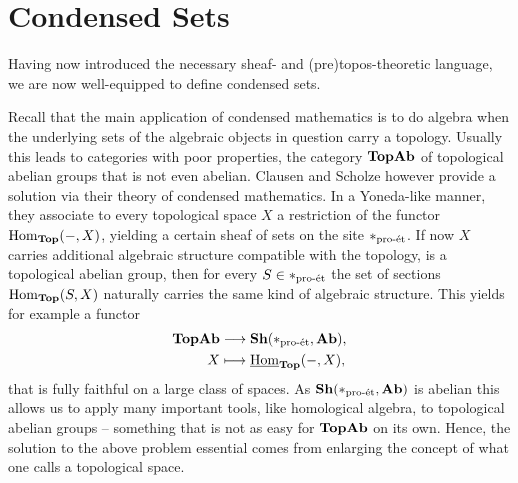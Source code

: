 
\section{Condensed Sets}
\label{section: condensed sets}

Having now introduced the necessary sheaf- and (pre)topos-theoretic language, we are now well-equipped to define condensed sets.

Recall that the main application of condensed mathematics is to do algebra when the underlying sets of the algebraic objects in question carry a topology. Usually this leads to categories with poor properties, \eg the category $\TopAb$ of topological abelian groups that is not even abelian. Clausen and Scholze however provide a solution via their theory of condensed mathematics. In a Yoneda-like manner, they associate to every topological space $X$ a restriction of the functor $\Hom_\Top(-, X)$, yielding a certain sheaf of sets on the site $\proetalesite{\ast}$. If now $X$ carries additional algebraic structure compatible with the topology, \eg is a topological abelian group, then for every $S\in \proetalesite{\ast}$ the set of sections $\Hom_\Top(S, X)$ naturally carries the same kind of algebraic structure. This yields for example a functor
\begin{align*}
	\TopAb &\longrightarrow \Sheaves{\proetalesite{\ast}}{\Ab},\\
	X&\longmapsto \eHom_\Top(-, X),
\end{align*}
that is fully faithful on a large class of spaces. As $\Sheaves{\proetalesite{\ast}}{\Ab}$ is abelian this allows us to apply many important tools, like homological algebra, to topological abelian groups -- something that is not as easy for $\TopAb$ on its own. Hence, the solution to the above problem essential comes from enlarging the concept of what one calls a topological space.

